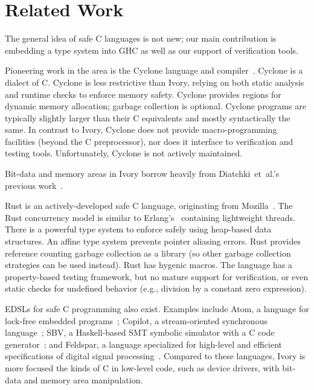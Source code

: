 \section{Related Work}
\label{sec:related-work}


The general idea of safe C languages is not new; our main contribution is
embedding a type system into GHC as well as our support of verification
tools.

Pioneering work in the area is the Cyclone language and
compiler~\cite{}. Cyclone is a dialect of C. Cyclone is less restrictive than
Ivory, relying on both static analysis and runtime checks to enforce memory
safety. Cyclone provides regions for dynamic memory allocation; garbage
collection is optional. Cyclone programs are typically slightly larger than
their C equivalents and mostly syntactically the same. In contrast to Ivory,
Cyclone does not provide macro-programming facilities (beyond the C
preprocessor), nor does it interface to verification and testing
tools. Unfortunately, Cyclone is not actively maintained.

Bit-data and memory areas in Ivory borrow heavily from Diatchki~et~al.'s
previous work~\cite{high-level, memareas}.

Rust is an actively-developed safe C language, originating from
Mozilla~\cite{}. The Rust concurrency model is similar to Erlang's~\cite{}
containing lightweight threads. There is a powerful type system to enforce
safely using heap-based data structures. An affine type system prevents pointer
aliasing errors. Rust provides reference counting garbage collection as a
library (so other garbage collection strategies can be used instead). Rust has
hygenic macros. The language has a property-based testing framework, but no
mature support for verification, or even static checks for undefined behavior
(e.g., division by a constant zero expression).

EDSLs for safe C programming also exist. Examples include Atom, a language for
lock-free embedded programs~\cite{}; Copilot, a stream-oriented synchronous
language~\cite{}; SBV, a Haskell-based SMT symbolic simulator with a C code
generator~\cite{}; and Feldspar, a language specialized for high-level and
efficient specifications of digital signal processing~\cite{}. Compared to these
languages, Ivory is more focused the kinds of C in low-level code, such as
device drivers, with bit-data and memory area manipulation.
